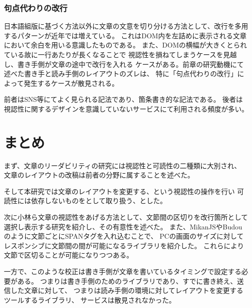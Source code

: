 \subsubsection{句点代わりの改行}
日本語組版に基づく方法以外に文章の文意を切り分ける方法として、改行を多用するパターンが近年では増えている。
これはDOM内を左詰めに表示される文章において余白を用いる意識したものである。
また、DOMの横幅が大きくとられている故に一行あたりが長くなることで
視認性を損ねてしまうケースを見越し、書き手側が文章の途中で改行を入れる
ケースがある。前章の研究動機にて述べた書き手と読み手側のレイアウトのズレは、
特に「句点代わりの改行」によって発生するケースが散見される。

前者はSNS等にてよく見られる記法であり、箇条書き的な記法である。
後者は視認性に関するデザインを意識していないサービスにて利用される頻度が多い。



\section{まとめ}
まず、文章のリーダビリティの研究には視認性と可読性の二種類に大別され、
文章のレイアウトの改稿は前者の分野に属することを述べた。

そして本研究では文章のレイアウトを変更する、という視認性の操作を行い
可読性には依存しないものをとして取り扱う、とした。

次に小林ら文章の視認性をあげる方法として、文節間の区切りを改行箇所として
選択し表示する研究を紹介し、その有意性を述べた。
また、MikanJSやBudouのように文節ごとにSPANタグを入れ込むことで、
PCの画面のサイズに対してレスポンシブに文節間の間が可能になるライブラリを紹介した。
これらにより文節で区切ることが可能になりつつある。

一方で、このような校正は書き手側が文章を書いているタイミングで設定する必要がある。
つまりは書き手側のためのライブラリであり、すでに書き終え、送信した文章に対して、
つまりは読み手側の環境に対してレイアウトを変更するツールするライブラリ、
サービスは散見されなかった。


